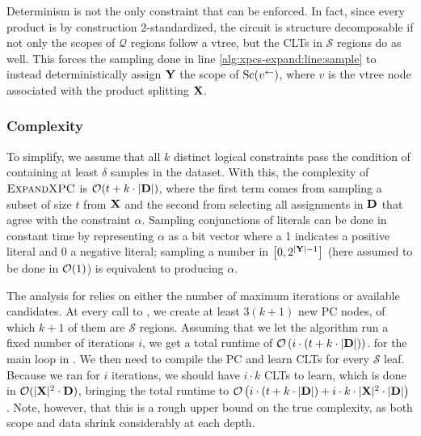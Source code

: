 Determinism is not the only constraint that can be enforced. In fact, since every product is by
construction 2-standardized, the circuit is structure decomposable if not only the scopes of
$\mathcal{Q}$ regions follow a vtree, but the CLTs in $\mathcal{S}$ regions do as well. This forces
the sampling done in line \ref{alg:xpcs-expand:line:sample} to instead deterministically assign
$\mathbf{Y}$ the scope of $\operatorname*{\normalfont{Sc}}(v^\gets)$, where $v$ is the vtree node associated with the product
splitting $\mathbf{X}$.

\subsubsection{Complexity}

To simplify, we assume that all $k$ distinct logical constraints pass the condition of containing
at least $\delta$ samples in the dataset. With this, the complexity of $\textproc{ExpandXPC}$ is
$\mathcal{O}(t+k\cdot|\mathbf{D}|)$, where the first term comes from sampling a subset of size $t$ from
$\mathbf{X}$ and the second from selecting all assignments in $\mathbf{D}$ that agree with the constraint
$\alpha$. Sampling conjunctions of literals can be done in constant time by representing $\alpha$
as a bit vector where a 1 indicates a positive literal and 0 a negative literal; sampling a number
in $\left[0,2^{|\mathbf{Y}|-1}\right]$ (here assumed to be done in $\mathcal{O}(1)$) is equivalent to
producing $\alpha$.

The analysis for  relies on either the number of maximum iterations or available
candidates. At every call to , we create at least $3(k+1)$ new PC nodes, of
which $k+1$ of them are $\mathcal{S}$ regions. Assuming that we let the algorithm run a fixed number
of iterations $i$, we get a total runtime of $\mathcal{O}\left(i\cdot\left(t+k\cdot|\mathbf{D}|\right)\right)$.
for the main loop in . We then need to compile the PC and learn CLTs for every
$\mathcal{S}$ leaf. Because we ran for $i$ iterations, we should have $i\cdot k$ CLTs to learn,
which is done in $\mathcal{O}(|\mathbf{X}|^2\cdot\mathbf{D})$, bringing the total runtime to
$\mathcal{O}\left(i\cdot\left(t+k\cdot|\mathbf{D}|\right)+i\cdot k\cdot|\mathbf{X}|^2\cdot|\mathbf{D}|\right)$.
Note, however, that this is a rough upper bound on the true complexity, as both scope and data
shrink considerably at each depth.

